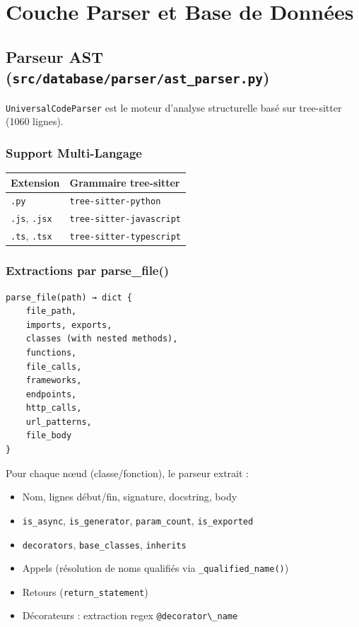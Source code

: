 \documentclass[12pt,a4paper]{article}
\newcommand{\code}[1]{\texttt{#1}}
\begin{document}
\section{Couche Parser et Base de Données}

\subsection{Parseur AST (\code{src/database/parser/ast\_parser.py})}

\code{UniversalCodeParser} est le moteur d'analyse structurelle basé sur tree-sitter (1060 lignes).

\subsubsection{Support Multi-Langage}

\begin{center}
\begin{tabularx}{\textwidth}{lX}
\toprule
\textbf{Extension} & \textbf{Grammaire tree-sitter} \\
\midrule
\code{.py} & \code{tree-sitter-python} \\
\code{.js}, \code{.jsx} & \code{tree-sitter-javascript} \\
\code{.ts}, \code{.tsx} & \code{tree-sitter-typescript} \\
\bottomrule
\end{tabularx}
\end{center}

\subsubsection{Extractions par parse\_file()}

\begin{lstlisting}
parse_file(path) → dict {
    file_path,
    imports, exports,
    classes (with nested methods),
    functions,
    file_calls,
    frameworks,
    endpoints,
    http_calls,
    url_patterns,
    file_body
}
\end{lstlisting}

Pour chaque nœud (classe/fonction), le parseur extrait :
\begin{itemize}
    \item Nom, lignes début/fin, signature, docstring, body
    \item \code{is\_async}, \code{is\_generator}, \code{param\_count}, \code{is\_exported}
    \item \code{decorators}, \code{base\_classes}, \code{inherits}
    \item Appels (résolution de noms qualifiés via \code{\_qualified\_name()})
    \item Retours (\code{return\_statement})
    \item Décorateurs : extraction regex \verb|@decorator\_name|
\end{itemize}
\end{document}
